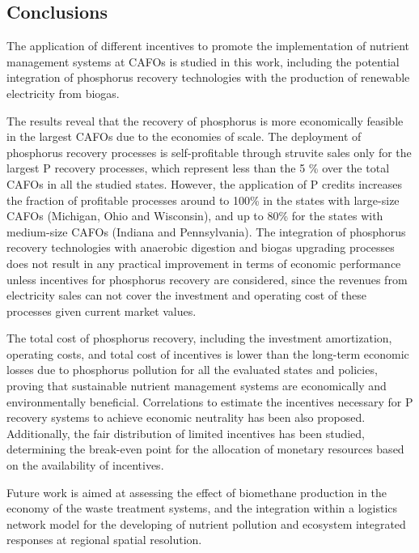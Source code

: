 \begin{refsection}[referencesCh5]
\section{Conclusions}
The application of different incentives to promote the implementation of nutrient management systems at CAFOs is studied in this work, including the potential integration of phosphorus recovery technologies with the production of renewable electricity from biogas. 

The results reveal that the recovery of phosphorus is more economically feasible in the largest CAFOs due to the economies of scale. The deployment of phosphorus recovery processes is self-profitable through struvite sales only for the largest P recovery processes, which represent less than the 5 \% over the total CAFOs in all the studied states. However, the application of P credits increases the fraction of profitable processes around to 100\% in the states with large-size CAFOs (Michigan, Ohio and Wisconsin), and up to 80\% for the states with medium-size CAFOs (Indiana and Pennsylvania). The integration of phosphorus recovery technologies with anaerobic digestion and biogas upgrading processes does not result in any practical improvement in terms of economic performance unless incentives for phosphorus recovery are considered, since the revenues from electricity sales can not cover the investment and operating cost of these processes given current market values.

The total cost of phosphorus recovery, including the investment amortization, operating costs, and total cost of incentives is lower than the long-term economic losses due to phosphorus pollution for all the evaluated states and policies, proving that sustainable nutrient management systems are economically and environmentally beneficial. Correlations to estimate the incentives necessary for P recovery systems to achieve economic neutrality has been also proposed. Additionally, the fair distribution of limited incentives has been studied, determining the break-even point for the allocation of monetary resources based on the availability of incentives.

Future work is aimed at assessing the effect of biomethane production in the economy of the waste treatment systems, and the integration within a logistics network model for the developing of nutrient pollution and ecosystem integrated responses at regional spatial resolution.


\end{refsection}
